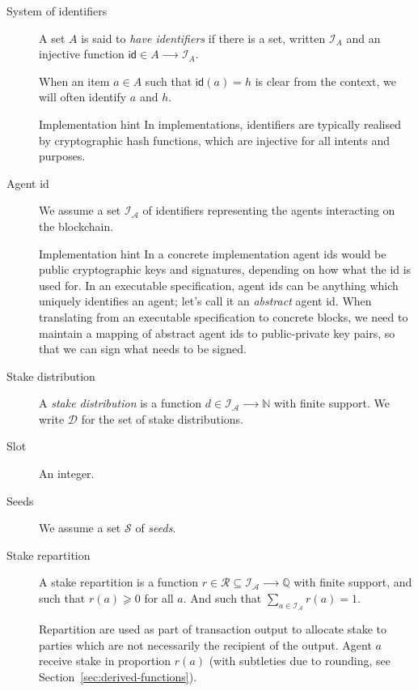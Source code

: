 \documentclass{article}
\newenvironment{implementationhint}{\begin{bclogo}[noborder=true,
    logo=\bccrayon, epBarre=3, couleurBarre=PineGreen]{Implementation hint}}{\end{bclogo}}
\newcommand{\idsof}[1]{\mathcal{I}\!_#1}
\newcommand{\id}{\mathsf{id}}
\newcommand{\agentids}{\idsof{\mathcal{A}}}
\newcommand{\stakedistributions}{\mathcal{D}}
\newcommand{\seeds}{\mathcal{S}}
\newcommand{\stakerepartitions}{\mathcal{R}}
\begin{document}
\begin{description}
\item[System of identifiers] A set $A$ is said to \emph{have
    identifiers} if there is a set, written $\idsof{A}$ and an
  injective function $\id ∈ A ⟶ \idsof{A}$.

  When an item $a∈A$ such that $\id(a) = h$ is clear from the context,
  we will often identify $a$ and $h$.

  \begin{implementationhint}
    In implementations, identifiers are typically realised by
    cryptographic hash functions, which are injective for all intents
    and purposes.
  \end{implementationhint}

\item[Agent id] We assume a set $\agentids$ of identifiers
  representing the agents interacting on the blockchain.
  \begin{implementationhint}
    In a concrete implementation agent ids would be public
    cryptographic keys and signatures, depending on how what the id is
    used for. In an executable specification, agent ids can be
    anything which uniquely identifies an agent; let's call it an
    \emph{abstract} agent id. When translating from an executable
    specification to concrete blocks, we need to maintain a mapping of
    abstract agent ids to public-private key pairs, so that we can
    sign what needs to be signed.
  \end{implementationhint}


\item[Stake distribution] A \emph{stake distribution} is a function
  $d ∈ \agentids ⟶ ℕ$ with finite support. We write
  $\stakedistributions$ for the set of stake distributions.

\item[Slot] An integer.

\item[Seeds] We assume a set $\seeds$ of \emph{seeds}.

\item[Stake repartition] A stake repartition is a function
  $r ∈ \stakerepartitions ⊆ \agentids ⟶ \mathbb{Q}$ with finite
  support, and such that $r(a) ⩾ 0$ for all $a$. And such that
  $∑_{a∈\agentids} r(a) = 1$.

  Repartition are used as part of transaction output to allocate stake
  to parties which are not necessarily the recipient of the
  output. Agent $a$ receive stake in proportion $r(a)$ (with
  subtleties due to rounding, see
  Section~\ref{sec:derived-functions}).


\end{description}
\end{document}
